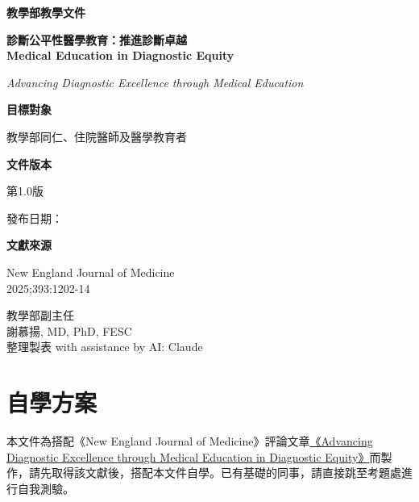 \documentclass[12pt,a4paper]{article}
\newcommand{\mydate}{\DTMtoday}
\begin{document}
\begin{titlepage}
    \centering
    {\LARGE\textcolor{emergency_red}{\textbf{教學部教學文件}}\par}
    \vspace{1cm}
    {\huge\bfseries 診斷公平性醫學教育：推進診斷卓越\\Medical Education in Diagnostic Equity\par}
    \vspace{0.5cm}
    {\Large\textcolor{emergency_blue}{\textit{Advancing Diagnostic Excellence through Medical Education}}\par}
    \vspace{1cm}
    
    \begin{tcolorbox}[
        colback=emergency_blue!5!white,
        colframe=emergency_blue,
        width=0.8\textwidth,
        arc=10pt,
        boxrule=1pt
    ]
    \centering
    {\large\textbf{目標對象}\par}
    \vspace{0.3cm}
    教學部同仁、住院醫師及醫學教育者\par
    \vspace{0.5cm}
    {\large\textbf{文件版本}\par}
    \vspace{0.3cm}
    第1.0版\par
    發布日期：\mydate\par
    \vspace{0.5cm}
    {\large\textbf{文獻來源}\par}
    \vspace{0.3cm}
    New England Journal of Medicine\\
    2025;393:1202-14\par
    \end{tcolorbox}

    \vfill
    
    {\large 教學部副主任\\謝慕揚, MD, PhD, FESC\\
    整理製表 with assistance by AI: Claude\par}
    
    \vspace{0.5cm}
\end{titlepage}

\newpage
\tableofcontents
\newpage

\section{自學方案}
本文件為搭配《New England Journal of Medicine》評論文章\href{https://www.nejm.org/doi/full/10.1056/NEJMra2411880}{《Advancing Diagnostic Excellence through Medical Education in Diagnostic Equity》}而製作，請先取得該文獻後，搭配本文件自學。已有基礎的同事，請直接跳至考題處進行自我測驗。
\end{document}
